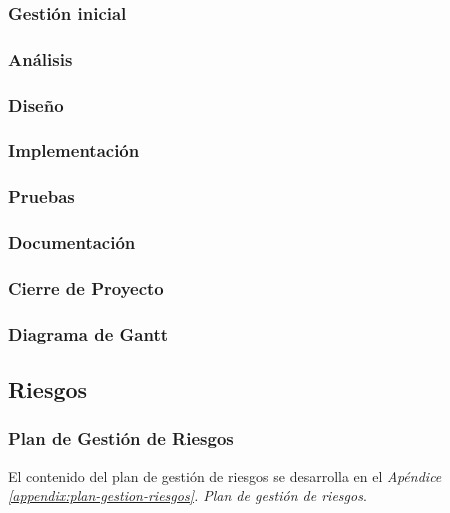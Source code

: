 \subsubsection{Gestión inicial}

\subsubsection{Análisis}

\subsubsection{Diseño}

\subsubsection{Implementación}

\subsubsection{Pruebas}

\subsubsection{Documentación}

\subsubsection{Cierre de Proyecto}

\subsubsection{Diagrama de Gantt}

\subsection{Riesgos}
\subsubsection{Plan de Gestión de Riesgos}
El contenido del plan de gestión de riesgos se desarrolla en el \textit{Apéndice \ref{appendix:plan-gestion-riesgos}. Plan de gestión de riesgos}.
